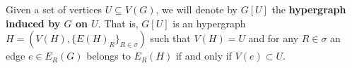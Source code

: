 \documentclass[12pt,notitlepage,a4paper]{article}
\theoremstyle{definition}
\newcommand{\aut}{\mathrm{aut}}
\begin{document}
Given a set of vertices $U\subseteq V(G)$, 
we will denote by $G[U]$ the \textbf{hypergraph induced
by $G$ on $U$}. That is, $G[U]$ is an hypergraph
$H=(V(H),\{E(H)_R\}_{R\in \sigma})$ such that 
$V(H)=U$ and for any $R\in \sigma$ 
an edge $e\in E_R(G)$ belongs 
to $E_R(H)$ if and only if $V(e)\subset U$.
\par
%
%

%
\end{document}
